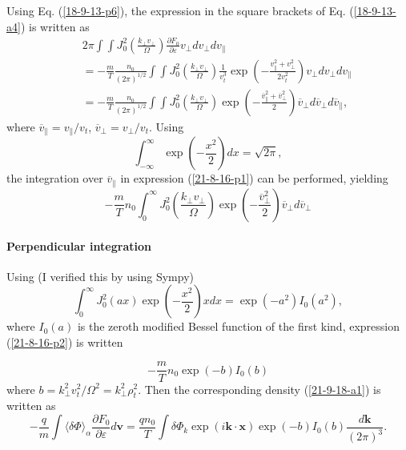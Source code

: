 \documentclass{llncs}
\begin{document}
Using Eq. (\ref{18-9-13-p6}), the expression in the square brackets of Eq.
(\ref{18-9-13-a4}) is written as
\begin{eqnarray}
  &  & 2 \pi \int \int J_0^2 \left( \frac{k_{\perp} v_{\perp}}{\Omega}
  \right) \frac{\partial F_0}{\partial \varepsilon} v_{\perp} d v_{\perp} d
  v_{\parallel} \nonumber\\
  &  & = - \frac{m}{T} \frac{n_0}{(2 \pi)^{1 / 2}} \int \int J_0^2 \left(
  \frac{k_{\perp} v_{\perp}}{\Omega} \right) \frac{1}{v_t^3} \exp \left( -
  \frac{v^2_{\parallel} + v_{\perp}^2}{2 v_t^2} \right) v_{\perp} d v_{\perp}
  d v_{\parallel} \\
  &  & = - \frac{m}{T} \frac{n_0}{(2 \pi)^{1 / 2}} \int \int J_0^2 \left(
  \frac{k_{\perp} v_{\perp}}{\Omega} \right) \exp \left( -
  \frac{\overline{v}^2_{\parallel} + \overline{v}_{\perp}^2}{2} \right)
  \overline{v}_{\perp} d \overline{v}_{\perp} d \overline{v}_{\parallel}, 
  \label{21-8-16-p1}
\end{eqnarray}
where $\overline{v}_{\parallel} = v_{\parallel} / v_t$, $\overline{v}_{\perp}
= v_{\perp} / v_t$. Using
\begin{equation}
  \int_{- \infty}^{\infty} \exp \left( - \frac{x^2}{2} \right) d x = \sqrt{2
  \pi},
\end{equation}
the integration over $\overline{v}_{\parallel}$ in expression
(\ref{21-8-16-p1}) can be performed, yielding
\begin{equation}
  \label{21-8-16-p2} - \frac{m}{T} n_0 \int_0^{\infty} J_0^2 \left(
  \frac{k_{\perp} v_{\perp}}{\Omega} \right) \exp \left( -
  \frac{\overline{v}_{\perp}^2}{2} \right) \overline{v}_{\perp} d
  \overline{v}_{\perp}
\end{equation}

\paragraph{Perpendicular integration}

Using (I verified this by using Sympy)
\begin{equation}
  \int_0^{\infty} J_0^2 (a x) \exp \left( - \frac{x^2}{2} \right) x d x = \exp
  (- a^2) I_0 (a^2),
\end{equation}
where $I_0 (a)$ is the zeroth modified Bessel function of the first kind,
expression (\ref{21-8-16-p2}) is written


\begin{equation}
  - \frac{m}{T} n_0 \exp (- b) I_0 (b)
\end{equation}
where $b = k_{\perp}^2 v_t^2 / \Omega^2 = k_{\perp}^2 \rho^2_t$. Then the
corresponding density (\ref{21-9-18-a1}) is written as
\begin{equation}
  \label{18-9-13-p7} - \frac{q}{m} \int \langle \delta \Phi \rangle_{\alpha}
  \frac{\partial F_0}{\partial \varepsilon} d\mathbf{v}= \frac{q n_0}{T}  \int
  \delta \Phi_k \exp (i\mathbf{k} \cdot \mathbf{x}) \exp (- b) I_0 (b)
  \frac{d\mathbf{k}}{(2 \pi)^3} .
\end{equation}
\end{document}
